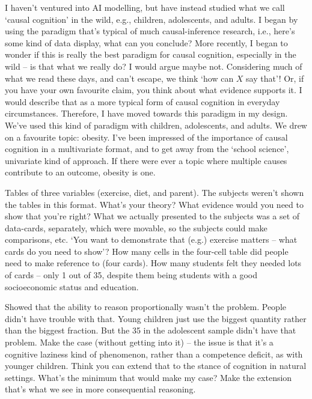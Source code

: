 
\begin{affils}
\end{affils}

I haven't ventured into AI modelling, but have instead studied what we call `causal
cognition' in the wild, e.g., children, adolescents, and adults.
I began by using the paradigm that's typical of much causal-inference research, i.e.,
here's some kind of data display, what can you conclude?
More recently, I began to wonder if this is really the best paradigm for causal
cognition, especially in the wild -- is that what we really do?
I would argue maybe not.
Considering much of what we read these days, and can't escape, we think `how can $X$
say that'!
Or, if you have your own favourite claim, you think about what evidence supports it.
I would describe that as a more typical form of causal cognition in everyday
circumstances.
Therefore, I have moved towards this paradigm in my design.
We've used this kind of paradigm with children, adolescents, and adults.
We drew on a favourite topic: obesity.
I've been impressed of the importance of causal cognition in a multivariate format, and
to get away from the `school science', univariate kind of approach.
If there were ever a topic where multiple causes contribute to an outcome, obesity is
one.

Tables of three variables (exercise, diet, and parent).
The subjects weren't shown the tables in this format.
What's your theory?
What evidence would you need to show that you're right?
What we actually presented to the subjects was a set of data-cards, separately, which
were movable, so the subjects could make comparisons, etc. `You want to demonstrate
that (e.g.) exercise matters -- what cards do you need to show'?
How many cells in the four-cell table did people need to make reference to (four
cards).
How many students felt they needed lots of cards -- only 1 out of 35, despite them
being students with a good socioeconomic status and education.

Showed that the ability to reason proportionally wasn't the problem.
People didn't have trouble with that.
Young children just use the biggest quantity rather than the biggest fraction.
But the 35 in the adolescent sample didn't have that problem.
Make the case (without getting into it) -- the issue is that it's a cognitive laziness
kind of phenomenon, rather than a competence deficit, as with younger children.
Think you can extend that to the stance of cognition in natural settings.
What's the minimum that would make my case?
Make the extension that's what we see in more consequential reasoning.

